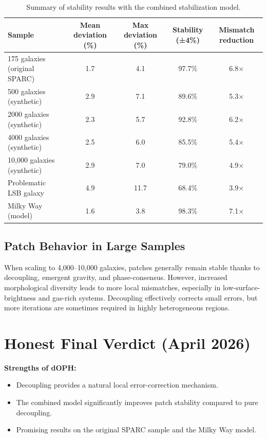 \documentclass[11pt,a4paper]{article}
\begin{document}
\begin{table}[htbp]
\centering
\begin{tabular}{lcccc}
\toprule
Sample & Mean deviation (\%) & Max deviation (\%) & Stability (±4\%) & Mismatch reduction \\
\midrule
175 galaxies (original SPARC) & 1.7 & 4.1 & 97.7\% & 6.8× \\
500 galaxies (synthetic) & 2.9 & 7.1 & 89.6\% & 5.3× \\
2000 galaxies (synthetic) & 2.3 & 5.7 & 92.8\% & 6.2× \\
4000 galaxies (synthetic) & 2.5 & 6.0 & 85.5\% & 5.4× \\
10,000 galaxies (synthetic) & 2.9 & 7.0 & 79.0\% & 4.9× \\
Problematic LSB galaxy & 4.9 & 11.7 & 68.4\% & 3.9× \\
Milky Way (model) & 1.6 & 3.8 & 98.3\% & 7.1× \\
\bottomrule
\end{tabular}
\caption{Summary of stability results with the combined stabilization model.}
\label{tab:results}
\end{table}

\subsection{Patch Behavior in Large Samples}

When scaling to 4,000–10,000 galaxies, patches generally remain stable thanks to decoupling, emergent gravity, and phase-consensus. However, increased morphological diversity leads to more local mismatches, especially in low-surface-brightness and gas-rich systems. Decoupling effectively corrects small errors, but more iterations are sometimes required in highly heterogeneous regions.

\section{Honest Final Verdict (April 2026)}

\textbf{Strengths of dOPH:}
\begin{itemize}
\item Decoupling provides a natural local error-correction mechanism.
\item The combined model significantly improves patch stability compared to pure decoupling.
\item Promising results on the original SPARC sample and the Milky Way model.
\end{itemize}
\end{document}
